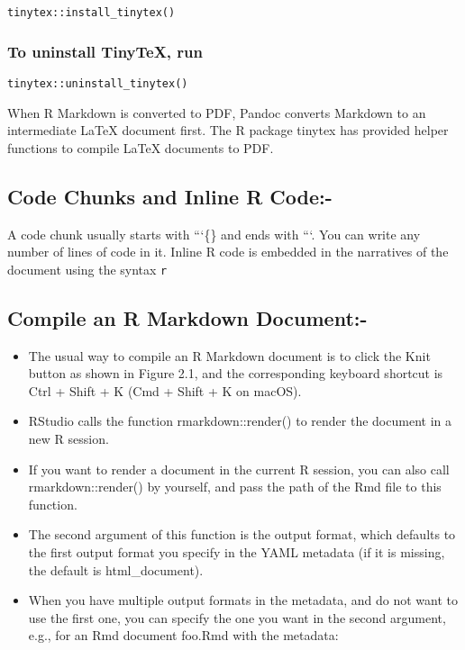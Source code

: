 \documentclass[
]{article}
\providecommand{\tightlist}{%
  \setlength{\itemsep}{0pt}\setlength{\parskip}{0pt}}
\begin{document}
\texttt{tinytex::install\_tinytex()}

\hypertarget{to-uninstall-tinytex-run}{%
\subsubsection{To uninstall TinyTeX,
run}\label{to-uninstall-tinytex-run}}

\texttt{tinytex::uninstall\_tinytex()}

When R Markdown is converted to PDF, Pandoc converts Markdown to an
intermediate LaTeX document first. The R package tinytex has provided
helper functions to compile LaTeX documents to PDF.

\hypertarget{code-chunks-and-inline-r-code-}{%
\subsection{Code Chunks and Inline R
Code:-}\label{code-chunks-and-inline-r-code-}}

A code chunk usually starts with ```\{\} and ends with ```. You can
write any number of lines of code in it. Inline R code is embedded in
the narratives of the document using the syntax \texttt{r}

\hypertarget{compile-an-r-markdown-document-}{%
\subsection{Compile an R Markdown
Document:-}\label{compile-an-r-markdown-document-}}

\begin{itemize}
\tightlist
\item
  The usual way to compile an R Markdown document is to click the Knit
  button as shown in Figure 2.1, and the corresponding keyboard shortcut
  is Ctrl + Shift + K (Cmd + Shift + K on macOS).
\item
  RStudio calls the function rmarkdown::render() to render the document
  in a new R session.
\item
  If you want to render a document in the current R session, you can
  also call rmarkdown::render() by yourself, and pass the path of the
  Rmd file to this function.
\item
  The second argument of this function is the output format, which
  defaults to the first output format you specify in the YAML metadata
  (if it is missing, the default is html\_document).
\item
  When you have multiple output formats in the metadata, and do not want
  to use the first one, you can specify the one you want in the second
  argument, e.g., for an Rmd document foo.Rmd with the metadata:
\end{itemize}
\end{document}
